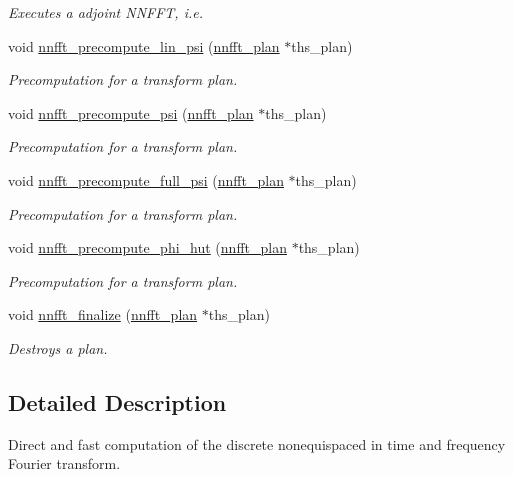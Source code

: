 \begin{CompactItemize}
\begin{CompactList}\small\item\em Executes a adjoint NNFFT, i.e. \item\end{CompactList}\item 
void \hyperlink{group__nnfft_ga6}{nnfft\_\-precompute\_\-lin\_\-psi} (\hyperlink{structnnfft__plan}{nnfft\_\-plan} $\ast$ths\_\-plan)
\begin{CompactList}\small\item\em Precomputation for a transform plan. \item\end{CompactList}\item 
void \hyperlink{group__nnfft_ga7}{nnfft\_\-precompute\_\-psi} (\hyperlink{structnnfft__plan}{nnfft\_\-plan} $\ast$ths\_\-plan)
\begin{CompactList}\small\item\em Precomputation for a transform plan. \item\end{CompactList}\item 
void \hyperlink{group__nnfft_ga8}{nnfft\_\-precompute\_\-full\_\-psi} (\hyperlink{structnnfft__plan}{nnfft\_\-plan} $\ast$ths\_\-plan)
\begin{CompactList}\small\item\em Precomputation for a transform plan. \item\end{CompactList}\item 
void \hyperlink{group__nnfft_ga9}{nnfft\_\-precompute\_\-phi\_\-hut} (\hyperlink{structnnfft__plan}{nnfft\_\-plan} $\ast$ths\_\-plan)
\begin{CompactList}\small\item\em Precomputation for a transform plan. \item\end{CompactList}\item 
void \hyperlink{group__nnfft_ga10}{nnfft\_\-finalize} (\hyperlink{structnnfft__plan}{nnfft\_\-plan} $\ast$ths\_\-plan)
\begin{CompactList}\small\item\em Destroys a plan. \item\end{CompactList}\end{CompactItemize}


\subsection{Detailed Description}
Direct and fast computation of the discrete nonequispaced in time and frequency Fourier transform. 



